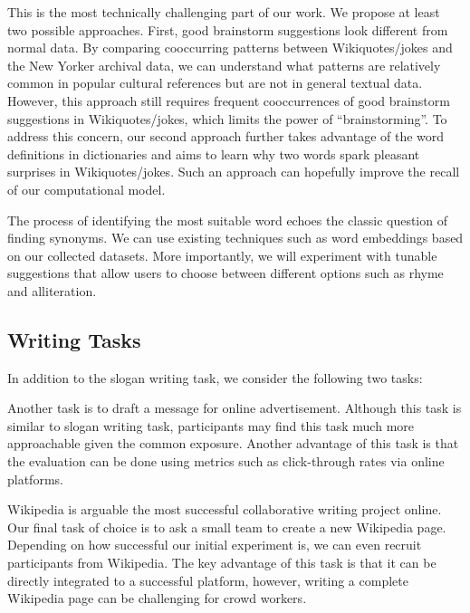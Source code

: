 This is the most technically challenging part of our work.
We propose at least two possible approaches.
First, good brainstorm suggestions look different from normal data.
By comparing cooccurring patterns between Wikiquotes/jokes and the New Yorker archival data, we can understand what patterns are relatively common in popular cultural references but are not in general textual data.
However, this approach still requires frequent cooccurrences of good brainstorm suggestions in Wikiquotes/jokes, which limits the power of ``brainstorming''.
To address this concern, our second approach further takes advantage of the word definitions in dictionaries and aims to learn why two words spark pleasant surprises in Wikiquotes/jokes.
Such an approach can hopefully improve the recall of our computational model.

 The process of identifying the most suitable word echoes the classic question of finding synonyms.
We can use existing techniques such as word embeddings based on our collected datasets.
More importantly, we will experiment with tunable suggestions that allow users to choose between different options such as rhyme and alliteration.

\subsection{Writing Tasks}
\label{sec:tasks}

In addition to the slogan writing task, we consider the following two tasks:

 Another task is to draft a message for online advertisement.
Although this task is similar to slogan writing task,
participants may find this task much more approachable given the common exposure.
Another advantage of this task is that the evaluation can be done using metrics such as click-through rates via online platforms.

 Wikipedia is arguable the most successful collaborative writing project online.
Our final task of choice is to ask a small team to create a new Wikipedia page.
Depending on how successful our initial experiment is, we can even recruit participants from Wikipedia.
The key advantage of this task is that it can be directly integrated to a successful platform, however, writing a complete Wikipedia page can be challenging for crowd workers.



